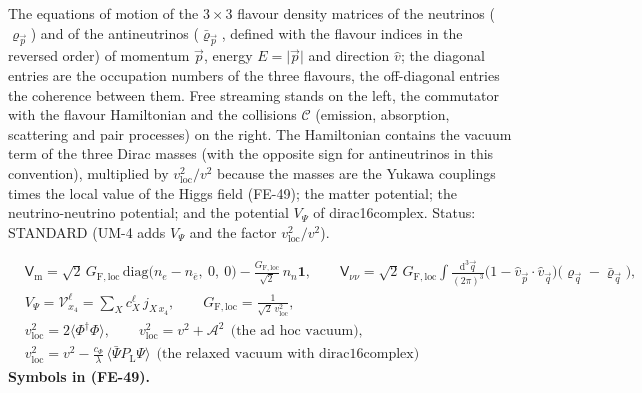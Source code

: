 \documentclass[
  10pt,
]{article}
\begin{document}
The equations of motion of the \(3 \times 3\) flavour density matrices
of the neutrinos (\(\varrho_{\vec p}\)) and of the antineutrinos
(\(\bar\varrho_{\vec p}\), defined with the flavour indices in the
reversed order) of momentum \(\vec p\), energy
\(E = \lvert\vec p\rvert\) and direction \(\hat v\); the diagonal
entries are the occupation numbers of the three flavours, the
off-diagonal entries the coherence between them. Free streaming stands
on the left, the commutator with the flavour Hamiltonian and the
collisions \(\mathcal{C}\) (emission, absorption, scattering and pair
processes) on the right. The Hamiltonian contains the vacuum term of the
three Dirac masses (with the opposite sign for antineutrinos in this
convention), multiplied by \(v_{\mathrm{loc}}^2/v^2\) because the masses
are the Yukawa couplings times the local value of the Higgs field
(FE-49); the matter potential; the neutrino-neutrino potential; and the
potential \(V_\Psi\) of dirac16complex. Status: STANDARD (UM-4 adds
\(V_\Psi\) and the factor \(v_{\mathrm{loc}}^2/v^2\)).

\[
\begin{aligned}
&\mathsf{V}_{\mathrm{m}} = \sqrt2\,G_{\mathrm{F,loc}}\,\mathrm{diag}\big(n_e - n_{\bar e},\ 0,\ 0\big) - \frac{G_{\mathrm{F,loc}}}{\sqrt2}\,n_n\mathbf{1},\qquad
 \mathsf{V}_{\nu\nu} = \sqrt2\,G_{\mathrm{F,loc}}\int\frac{\mathrm{d}^3\vec q}{(2\pi)^3}\big(1 - \hat v_{\vec p}\cdot\hat v_{\vec q}\big)\big(\varrho_{\vec q} - \bar\varrho_{\vec q}\big),\\
&V_\Psi = \mathcal{V}^{\ell}_{x_4} = \sum_X c^{\ell}_X\,j_{X\,x_4},\qquad G_{\mathrm{F,loc}} = \frac{1}{\sqrt2\,v_{\mathrm{loc}}^2},\\
&v_{\mathrm{loc}}^2 = 2\langle\Phi^\dagger\Phi\rangle,\qquad v_{\mathrm{loc}}^2 = v^2 + \mathcal{A}^2\ \ \text{(the ad hoc vacuum)},\\
&v_{\mathrm{loc}}^2 = v^2 - \frac{c_\Phi}{\lambda}\,\langle\bar\Psi P_{\mathrm{L}}\Psi\rangle\ \ \text{(the relaxed vacuum with dirac16complex)}
\end{aligned} \tag{FE-49}
\] \textbf{Symbols in (FE-49).}
\end{document}
